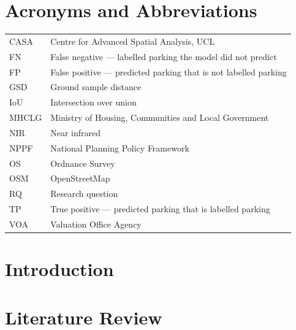 \documentclass[12pt,a4paper,oneside]{report}
\begin{document}
\cleardoublepage
{}
{}
\listoffigures

\cleardoublepage
{}
{}
\listoftables

\chapter*{Acronyms and Abbreviations}

\begin{tabular}{@{}p{3.2cm}p{\dimexpr\textwidth-3.6cm\relax}@{}}
\toprule
CASA & Centre for Advanced Spatial Analysis, UCL \\
FN & False negative --- labelled parking the model did not predict \\
FP & False positive --- predicted parking that is not labelled parking \\
GSD & Ground sample distance \\
IoU & Intersection over union \\
MHCLG & Ministry of Housing, Communities and Local Government \\
NIR & Near infrared \\
NPPF & National Planning Policy Framework \\
OS & Ordnance Survey \\
OSM & OpenStreetMap \\
RQ & Research question \\
TP & True positive --- predicted parking that is labelled parking \\
VOA & Valuation Office Agency \\
\bottomrule
\end{tabular}

\chapter{Introduction}
\chapter{Literature Review}
\end{document}
